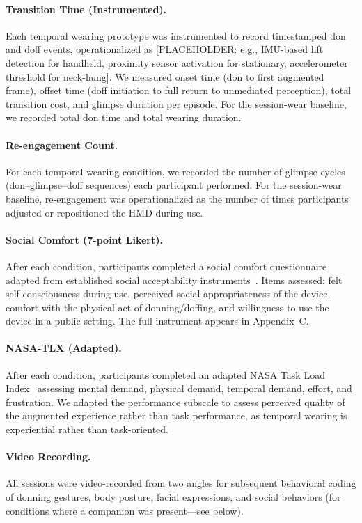 \paragraph{Transition Time (Instrumented).}
Each temporal wearing prototype was instrumented to record timestamped don and doff events, operationalized as [PLACEHOLDER: e.g., IMU-based lift detection for handheld, proximity sensor activation for stationary, accelerometer threshold for neck-hung]. We measured onset time (don to first augmented frame), offset time (doff initiation to full return to unmediated perception), total transition cost, and glimpse duration per episode. For the session-wear baseline, we recorded total don time and total wearing duration.

\paragraph{Re-engagement Count.}
For each temporal wearing condition, we recorded the number of glimpse cycles (don--glimpse--doff sequences) each participant performed. For the session-wear baseline, re-engagement was operationalized as the number of times participants adjusted or repositioned the HMD during use.

\paragraph{Social Comfort (7-point Likert).}
After each condition, participants completed a social comfort questionnaire adapted from established social acceptability instruments~\cite{koelle2020social, rico2010gestures}. Items assessed: felt self-consciousness during use, perceived social appropriateness of the device, comfort with the physical act of donning/doffing, and willingness to use the device in a public setting. The full instrument appears in Appendix~C.

\paragraph{NASA-TLX (Adapted).}
After each condition, participants completed an adapted NASA Task Load Index~\cite{hart1988development} assessing mental demand, physical demand, temporal demand, effort, and frustration. We adapted the performance subscale to assess perceived quality of the augmented experience rather than task performance, as temporal wearing is experiential rather than task-oriented.

\paragraph{Video Recording.}
All sessions were video-recorded from two angles for subsequent behavioral coding of donning gestures, body posture, facial expressions, and social behaviors (for conditions where a companion was present---see below).

